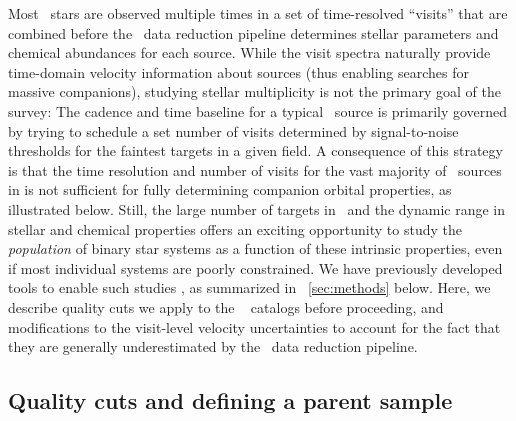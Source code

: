 \documentclass[modern]{aastex63}
\begin{document}
Most \apogee\ stars are observed multiple times in a set of time-resolved
``visits'' that are combined before the \apogee\ data reduction pipeline
\citep{ASPCAP} determines stellar parameters and chemical abundances for each
source.
While the visit spectra naturally provide time-domain velocity information about
sources (thus enabling searches for massive companions), studying stellar
multiplicity is not the primary goal of the survey:
The cadence and time baseline for a typical \apogee\ source is primarily
governed by trying to schedule a set number of visits determined by
signal-to-noise thresholds for the faintest targets in a given field.
A consequence of this strategy is that the time resolution and number of visits
for the vast majority of \apogee\ sources in  is not sufficient for fully
determining companion orbital properties, as illustrated below.
Still, the large number of targets in \apogee\ and the dynamic range in stellar
and chemical properties offers an exciting opportunity to study the
\emph{population} of binary star systems as a function of these intrinsic
properties, even if most individual systems are poorly constrained.
We have previously developed tools to enable such studies \citep{thejoker}, as
summarized in \sectionname~\ref{sec:methods} below.
Here, we describe quality cuts we apply to the \apogee\  catalogs before
proceeding, and modifications to the visit-level velocity uncertainties to
account for the fact that they are generally underestimated by the \apogee\ data
reduction pipeline.


\subsection{Quality cuts and defining a parent sample}
\end{document}
